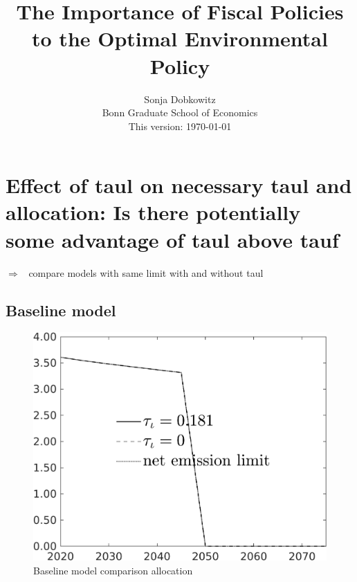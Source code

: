 \documentclass[12pt]{article}
\title{The Importance of Fiscal Policies to the Optimal Environmental Policy}
\date{Sonja Dobkowitz\\ Bonn Graduate School of Economics\\ %
	\vspace{1mm}
	This version: \today }
\newcommand{\ar}{$\Rightarrow$ \ }
\begin{document}
\section{Effect of taul on necessary taul and allocation: Is there potentially some advantage of taul above tauf}

\ar compare models with same limit with and without taul
\subsection{Baseline model}
\begin{figure}[h!!]
	\centering
	\caption{Baseline model comparison allocation}\label{fig:Leveltauf_nsk0_xgr0_notaul}
	\begin{minipage}[]{0.32\textwidth}
		\includegraphics[width=1\textwidth]{../../codding_model/own_basedOnFried/optimalPol_010922_revision/figures/all_13Sept22/CompTauf_bytaul_Reg0_Emnet_spillover0_nsk0_xgr0_knspil0_sep1_LFlimit1_emsbase0_countec0_GovRev0_etaa0.79_lgd1.png}
\end{minipage}		
\begin{minipage}[]{0.32\textwidth}

\end{minipage}
\end{figure}
\end{document}
